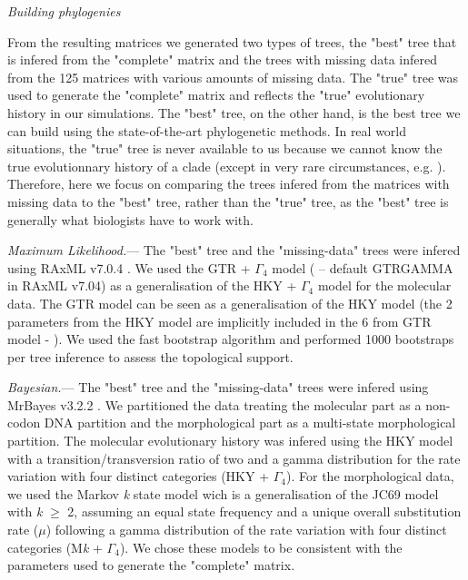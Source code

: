 \documentclass[12pt,letterpaper]{article}
\renewcommand{\subsection}[1]{%
\bigskip
\begin{center}
\begin{large}
\normalfont\itshape #1
\end{large}
\end{center}}
\renewcommand{\subsubsection}[1]{%
\vspace{2ex}
\noindent
\textit{#1.}---}
\begin{document}
\subsection{Building phylogenies}
From the resulting matrices we generated two types of trees, the "best" tree that is infered from the "complete" matrix and the trees with missing data infered from the 125 matrices with various amounts of missing data. The "true" tree was used to generate the "complete" matrix and reflects the "true" evolutionary history in our simulations. The "best" tree, on the other hand, is the best tree we can build using the state-of-the-art phylogenetic methods. In real world situations, the "true" tree is never available to us because we cannot know the true evolutionnary history of a clade (except in very rare circumstances, e.g. \citet{rozen2005}). Therefore, here we focus on comparing the trees infered from the matrices with missing data to the "best" tree, rather than the "true" tree, as the "best" tree is generally what biologists have to work with.

\subsubsection{Maximum Likelihood}
The "best" tree and the "missing-data" trees were infered using RAxML v7.0.4 \citep{stamatakisthe2008}. We used the GTR + $\Gamma_4$ model (\citet{tavare1986} – default GTRGAMMA in RAxML v7.04) as a generalisation of the HKY + $\Gamma_4$ model \citep{HKY85} for the molecular data. The GTR model can be seen as a generalisation of the HKY model (the 2 parameters from the HKY model are implicitly included in the 6 from GTR model - \citet{stamatakisa2008}). We used the fast bootstrap algorithm and performed 1000 bootstraps per tree inference to assess the topological support. %

\subsubsection{Bayesian}
The "best" tree and the "missing-data" trees were infered using MrBayes v3.2.2 \citep{Ronquist2012mrbayes}. We partitioned the data treating the molecular part as a non-codon DNA partition and the morphological part as a multi-state morphological partition. The molecular evolutionary history was infered using the HKY model with a transition/transversion ratio \citep{douadycomparison2003} of two and a gamma distribution for the rate variation with four distinct categories (HKY + $\Gamma_4$). For the morphological data, we used the Markov \textit{k} state model \citep{lewisa2001} wich is a generalisation of the JC69 model \citep{jc69} with \textit{k} $≥$ 2, assuming an equal state frequency and a unique overall substitution rate ($\mu$) following a gamma distribution of the rate variation with four distinct categories (M\textit{k} + $\Gamma_4$). We chose these models to be consistent with the parameters used to generate the "complete" matrix.
\end{document}
